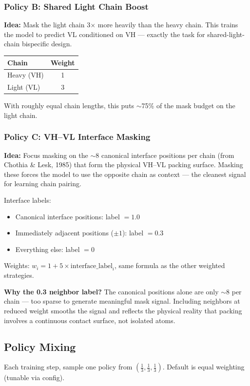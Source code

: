 \documentclass[11pt]{article}
\begin{document}
\subsubsection{Policy B: Shared Light Chain Boost}

\textbf{Idea:} Mask the light chain 3$\times$ more heavily than
the heavy chain. This trains the model to predict VL conditioned
on VH --- exactly the task for shared-light-chain bispecific design.

\begin{center}
\begin{tabular}{lc}
\toprule
Chain & Weight \\
\midrule
Heavy (VH) & 1 \\
Light (VL) & 3 \\
\bottomrule
\end{tabular}
\end{center}

With roughly equal chain lengths, this puts $\sim$75\% of the
mask budget on the light chain.

\subsubsection{Policy C: VH--VL Interface Masking}

\textbf{Idea:} Focus masking on the $\sim$8 canonical interface
positions per chain (from Chothia \& Lesk, 1985) that form the
physical VH--VL packing surface. Masking these forces the model
to use the opposite chain as context --- the cleanest signal for
learning chain pairing.

Interface labels:
\begin{itemize}
\item Canonical interface positions: label $= 1.0$
\item Immediately adjacent positions ($\pm 1$): label $= 0.3$
\item Everything else: label $= 0$
\end{itemize}

Weights: $w_i = 1 + 5 \times \text{interface\_label}_i$, same
formula as the other weighted strategies.

\textbf{Why the 0.3 neighbor label?} The canonical positions alone
are only $\sim$8 per chain --- too sparse to generate meaningful
mask signal. Including neighbors at reduced weight smooths the
signal and reflects the physical reality that packing involves a
continuous contact surface, not isolated atoms.

\subsection{Policy Mixing}
Each training step, sample one policy from
$(\frac{1}{3}, \frac{1}{3}, \frac{1}{3})$. Default is equal
weighting (tunable via config).
\end{document}
